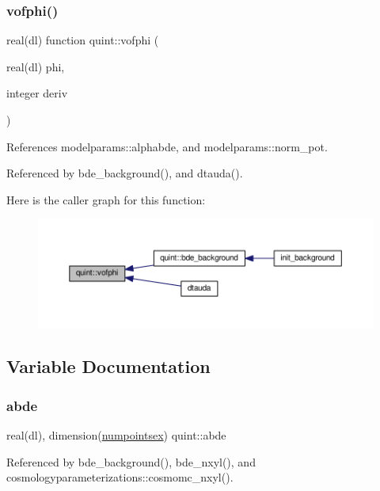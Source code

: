 \subsubsection{\texorpdfstring{vofphi()}{vofphi()}}
{\footnotesize\ttfamily real(dl) function quint\+::vofphi (\begin{DoxyParamCaption}\item[{real(dl)}]{phi,  }\item[{integer}]{deriv }\end{DoxyParamCaption})}



References modelparams\+::alphabde, and modelparams\+::norm\+\_\+pot.



Referenced by bde\+\_\+background(), and dtauda().

Here is the caller graph for this function\+:
\nopagebreak
\begin{figure}[H]
\begin{center}
\leavevmode
\includegraphics[width=350pt]{namespacequint_aeb3b6422b8cc4a091d00b74a6c2d6bf6_icgraph}
\end{center}
\end{figure}


\subsection{Variable Documentation}
\mbox{\label{namespacequint_a32c8893957513fe23c9798bd01dd57bd}} 
\subsubsection{\texorpdfstring{abde}{abde}}
{\footnotesize\ttfamily real(dl), dimension(\mbox{\hyperlink{namespacequint_a8388814d2fb6e0f54431a7257a8f86a9}{numpointsex}}) quint\+::abde}



Referenced by bde\+\_\+background(), bde\+\_\+nxyl(), and cosmologyparameterizations\+::cosmomc\+\_\+nxyl().

